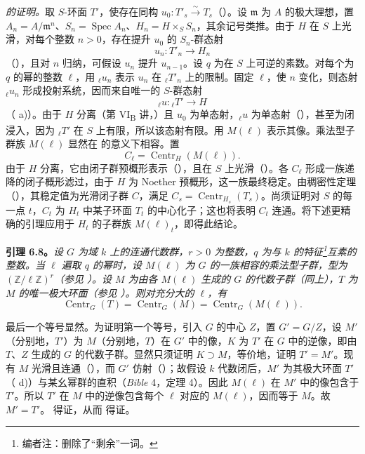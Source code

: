 \emph{ 的证明。}取 \(S\)-环面 \(T'\)，使存在同构 \(u_0:T'_s\xrightarrow{\sim}T_s\)（）。设 \(\mathfrak m\) 为 \(A\) 的极大理想，置 \(A_n=A/\mathfrak m^n\)、\(S_n=\operatorname{Spec}A_n\)、\(H_n=H\times_S S_n\)，其余记号类推。由于 \(H\) 在 \(S\) 上光滑，对每个整数 \(n>0\)，存在提升 \(u_0\) 的 \(S_n\)-群态射
\[
u_n:T'_n\longrightarrow H_n
\]
（），且对 \(n\) 归纳，可假设 \(u_n\) 提升 \(u_{n-1}\)。设 \(q\) 为在 \(S\) 上可逆的素数。对每个为 \(q\) 的幂的整数 \(\ell\)，用 \({}_{\ell}u_n\) 表示 \(u_n\) 在 \({}_{\ell}T'_n\) 上的限制。固定 \(\ell\)，使 \(n\) 变化，则态射 \({}_{\ell}u_n\) 形成投射系统，因而来自唯一的 \(S\)-群态射
\[
{}_{\ell}u:{}_{\ell}T'\longrightarrow H
\]
（ a)）。由于 \(H\) 分离（第 VI\textsubscript{B} 讲，）且 \(u_0\) 为单态射，\({}_{\ell}u\) 为单态射（），甚至为闭浸入，因为 \({}_{\ell}T'\) 在 \(S\) 上有限，所以该态射有限。用 \(M(\ell)\) 表示其像。乘法型子群族 \(M(\ell)\) 显然在  的意义下相容。置
\[
C_\ell=\operatorname{Centr}_H(M(\ell)).
\]
由于 \(H\) 分离，它由闭子群预概形表示（），且在 \(S\) 上光滑（）。各 \(C_\ell\) 形成一族递降的闭子概形滤过，由于 \(H\) 为 Noether 预概形，这一族最终稳定。由稠密性定理（），其稳定值为光滑闭子群 \(C\)，满足 \(C_s=\operatorname{Centr}_{H_s}(T_s)\)。尚须证明对 \(S\) 的每一点 \(t\)，\(C_t\) 为 \(H_t\) 中某子环面 \(T_t\) 的中心化子；这也将表明 \(C_t\) 连通。将下述更精确的引理应用于 \(H_t\) 的子群族 \(M(\ell)_t\)，即得此结论。

\textbf{引理 6.8。}\emph{设 \(G\) 为域 \(k\) 上的连通代数群，\(r>0\) 为整数，\(q\) 为与 \(k\) 的特征\footnote{编者注：删除了“剩余”一词。}互素的整数。当 \(\ell\) 遍取 \(q\) 的幂时，设 \(M(\ell)\) 为 \(G\) 的一族相容的乘法型子群，型为 \((\mathbb Z/\ell\mathbb Z)^r\)（参见 ）。设 \(M\) 为由各 \(M(\ell)\) 生成的 \(G\) 的代数子群（同上），\(T\) 为 \(M\) 的唯一极大环面（参见 ）。则对充分大的 \(\ell\)，有
\[
\operatorname{Centr}_G(T)=\operatorname{Centr}_G(M)
  =\operatorname{Centr}_G(M(\ell)).
\]}

最后一个等号显然。为证明第一个等号，引入 \(G\) 的中心 \(Z\)，置 \(G'=G/Z\)，设 \(M'\)（分别地，\(T'\)）为 \(M\)（分别地，\(T\)）在 \(G'\) 中的像，\(K\) 为 \(T'\) 在 \(G\) 中的逆像，即由 \(T\)、\(Z\) 生成的 \(G\) 的代数子群。显然只须证明 \(K\supset M\)，等价地，证明 \(T'=M'\)。现有 \(M\) 光滑且连通（），而 \(G'\) 仿射（）；故假设 \(k\) 代数闭后，\(M'\) 为其极大环面 \(T'\)（ d)）与某幺幂群的直积（\emph{Bible} 4，定理 4）。因此 \(M(\ell)\) 在 \(M'\) 中的像包含于 \(T'\)。所以 \(T'\) 在 \(M\) 中的逆像包含每个 \(\ell\) 对应的 \(M(\ell)\)，因而等于 \(M\)。故 \(M'=T'\)。 得证，从而  得证。

